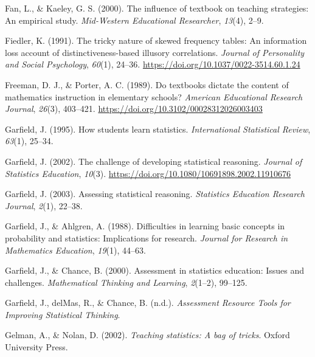\documentclass[11pt]{umnthesis}
\newlength{\cslhangindent}
\newenvironment{CSLReferences}[2] %
 {%
  \setlength{\parindent}{0pt}
  \ifodd #1 \everypar{\setlength{\hangindent}{\cslhangindent}}\ignorespaces\fi
  \ifnum #2 > 0
  \setlength{\parskip}{#2\baselineskip}
  \fi
 }%
 {}
\begin{document}
\begin{CSLReferences}{1}{0}
\leavevmode{}%
Fan, L., \& Kaeley, G. S. (2000). The influence of textbook on teaching strategies: An empirical study. \emph{Mid-Western Educational Researcher}, \emph{13}(4), 2--9.

\leavevmode{}%
Fiedler, K. (1991). The tricky nature of skewed frequency tables: An information loss account of distinctiveness-based illusory correlations. \emph{Journal of Personality and Social Psychology}, \emph{60}(1), 24--36. \url{https://doi.org/10.1037/0022-3514.60.1.24}

\leavevmode{}%
Freeman, D. J., \& Porter, A. C. (1989). Do textbooks dictate the content of mathematics instruction in elementary schools? \emph{American Educational Research Journal}, \emph{26}(3), 403--421. \url{https://doi.org/10.3102/00028312026003403}

\leavevmode{}%
Garfield, J. (1995). How students learn statistics. \emph{International Statistical Review}, \emph{63}(1), 25--34.

\leavevmode{}%
Garfield, J. (2002). The challenge of developing statistical reasoning. \emph{Journal of Statistics Education}, \emph{10}(3). \url{https://doi.org/10.1080/10691898.2002.11910676}

\leavevmode{}%
Garfield, J. (2003). Assessing statistical reasoning. \emph{Statistics Education Research Journal}, \emph{2}(1), 22--38.

\leavevmode{}%
Garfield, J., \& Ahlgren, A. (1988). Difficulties in learning basic concepts in probability and statistics: Implications for research. \emph{Journal for Research in Mathematics Education}, \emph{19}(1), 44--63.

\leavevmode{}%
Garfield, J., \& Chance, B. (2000). Assessment in statistics education: Issues and challenges. \emph{Mathematical Thinking and Learning}, \emph{2}(1--2), 99--125.

\leavevmode{}%
Garfield, J., delMas, R., \& Chance, B. (n.d.). \emph{{Assessment Resource Tools for Improving Statistical Thinking}}.

\leavevmode{}%
Gelman, A., \& Nolan, D. (2002). \emph{Teaching statistics: A bag of tricks}. Oxford University Press.


\end{CSLReferences}
\end{document}
